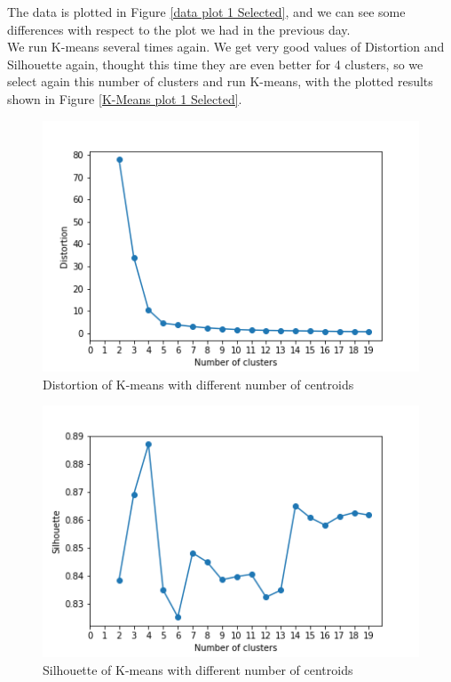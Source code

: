 \documentclass[idxtotoc,hyperref,openany]{labbook} %
\begin{document}
The data is plotted in Figure \ref{data plot 1 Selected}, and we can see some differences with respect to the plot we had in the previous day.
\\
We run K-means several times again. We get very good values of Distortion and Silhouette again, thought this time they are even better for 4 clusters, so we select again this number of clusters and run K-means, with the plotted results shown in Figure \ref{K-Means plot 1 Selected}.


\begin{figure}[h]
\includegraphics[width=0.9\linewidth]{KMeans_Distortion_Accelerometer_Day1_Selected.png}
\setlength\belowcaptionskip{-10pt}
\caption{Distortion of K-means with different number of centroids}
\label{K-means distortion 1 Selected}
\end{figure}

\begin{figure}[h]
\includegraphics[width=0.9\linewidth]{KMeans_Silhouette_Accelerometer_Day1_Selected.png}
\setlength\belowcaptionskip{-10pt}
\caption{Silhouette of K-means with different number of centroids}
\label{K-means silhouette 1 Selected}
\end{figure}
\end{document}
